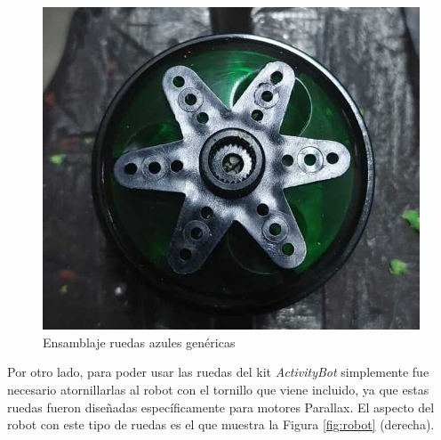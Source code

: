 \begin{figure}[ht!]
\begin{minipage}{0.40\linewidth}
	\end{minipage}
	\hspace{2cm}
	\begin{minipage}{0.40\linewidth}
		\centering
		\includegraphics[width=\linewidth]{figs/cap5/creacionra1.jpeg}
	\end{minipage}
	\caption{Ensamblaje ruedas azules genéricas}
	\label{fig:rae}
\end{figure}


Por otro lado, para poder usar las ruedas del kit \textit{ActivityBot} simplemente fue necesario atornillarlas al robot con el tornillo que viene incluido, ya que estas ruedas fueron diseñadas específicamente para motores Parallax. El aspecto del robot con este tipo de ruedas es el que muestra la Figura \ref{fig:robot} (derecha).


